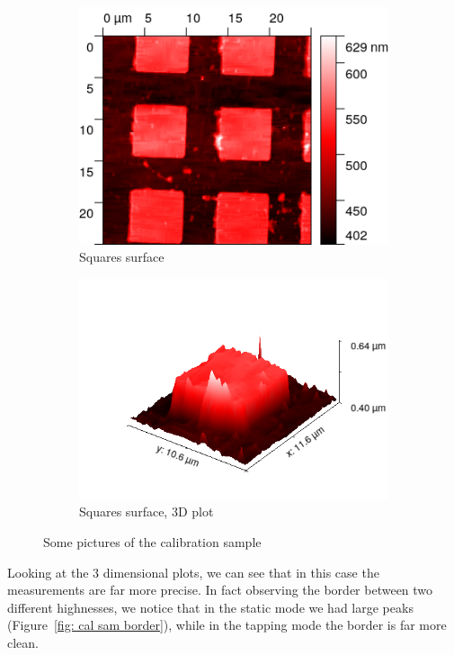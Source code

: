 \documentclass[11pt,a4paper]{article}
\begin{document}
\begin{figure}[H]
\begin{subfigure}[b]{0.45\textwidth}
\includegraphics[width=\textwidth]{tm_squares}
\caption{Squares surface}
\label{fig:}
\end{subfigure}
\begin{subfigure}[b]{0.45\textwidth}
\includegraphics[width=\textwidth]{tm_squares_3D}
\caption{Squares surface, 3D plot}
\label{fig:sm_border}
\end{subfigure}
\caption{Some pictures of the calibration sample}
\end{figure}
Looking at the 3 dimensional plots, we can see that in this case the measurements are far more precise. In fact observing the border between two different highnesses, we notice that in the static mode we had large peaks (Figure~\ref{fig: cal sam border}), while in the tapping mode the border is far more clean.
\end{document}
